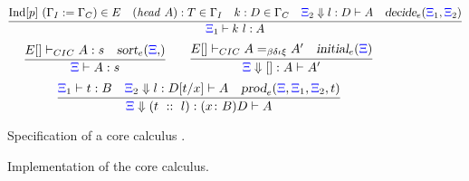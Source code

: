 \begin{figure}[t]
\centering
  \[
\infer{\XXi_1\vdash k\ l : A}
      { \mathrm{Ind}[p] \ (\Gamma_I := \Gamma_C) \in E\quad 
       (\mathit{head} \ A) : T \in \Gamma_I\quad  
       k : D \in \Gamma_C\quad 
       \bc{\XXi_2}{} l D A \quad\unfoldExpert{\XXi_1}{\XXi_2}} 
\]
\vskip -18pt
\[
  \infer{\XXi\vdash  A : s}{E[] \vdash_{CIC} A : s\quad \sortExpert{\XXi}}%
  \qquad
  \infer{\bc{\XXi}{}{[]} A A'}{E[]\vdash_{CIC} A =_{\beta\delta\iota\xi}A'\quad\initLExpert{\XXi}}
\]
  \vskip -18pt
\[
  \infer{\bc{\XXi}{}{(t\ ::\ l)}{\depprod{x}{B}{D}}{A}}
        {\XXi_1\vdash t : B\quad
         \bc{\XXi_2}{}l {D[t/x]} A\quad
         \prodE{\XXi}{\XXi_1}{\XXi_2}{t}}
\]
\caption{Specification of a core calculus%
  .}
\label{fig:augmented}
\end{figure}

\begin{figure}


\caption{Implementation of the core calculus.}
\label{fig:kernel}
\end{figure}

